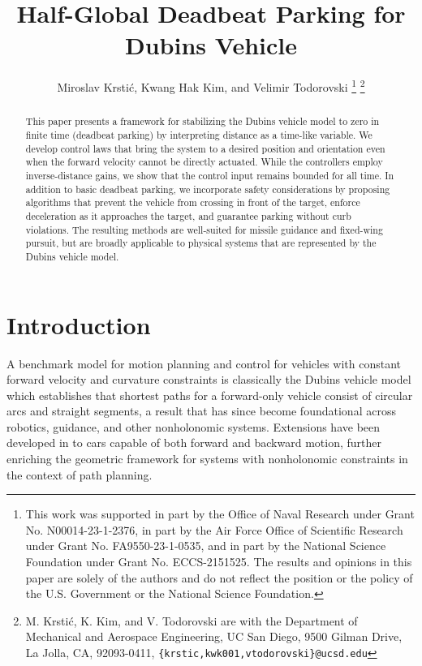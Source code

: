 \documentclass[letterpaper, 10 pt, conference]{ieeeconf}  %
\title{\LARGE \bf
Half-Global Deadbeat Parking for Dubins Vehicle
}
\author{Miroslav Krstić, Kwang Hak Kim, and Velimir Todorovski%
\thanks{This work was supported in part by the Office of Naval Research under Grant No. N00014-23-1-2376, in part by the Air Force Office of Scientific Research under Grant No. FA9550-23-1-0535, and in
part by the National Science Foundation under Grant No. ECCS-2151525. The results and opinions in this paper are solely of the authors and do not reflect the position or the policy of the U.S. Government or the National Science
Foundation.}%
\thanks{M. Krstić, K. Kim, and V. Todorovski are with the Department of Mechanical and Aerospace Engineering, UC San Diego, 9500 Gilman Drive, La Jolla, CA, 92093-0411, {\tt\small \{krstic,kwk001,vtodorovski\}@ucsd.edu}}%
}
\begin{document}
\maketitle
\thispagestyle{empty}
\pagestyle{empty}


\begin{abstract}
This paper presents a framework for stabilizing the Dubins vehicle model to zero in finite time (deadbeat parking) by interpreting distance as a time-like variable. We develop control laws that bring the system to a desired position and orientation even when the forward velocity cannot be directly actuated. While the controllers employ inverse-distance gains, we show that the control input remains bounded for all time. In addition to basic deadbeat parking, we incorporate safety considerations by proposing algorithms that prevent the vehicle from crossing in front of the target, enforce deceleration as it approaches the target, and guarantee parking without curb violations. The resulting methods are well-suited for missile guidance and fixed-wing pursuit, but are broadly applicable to physical systems that are represented by the Dubins vehicle model.
\end{abstract}


\section{Introduction}

A benchmark model for motion planning and control for vehicles with constant forward velocity and curvature constraints is classically the Dubins vehicle model \cite{dubins1957curves} which establishes that shortest paths for a forward-only vehicle consist of circular arcs and straight segments, a result that has since become foundational across robotics, guidance, and other nonholonomic systems. Extensions have been developed in \cite{reeds1990optimal} to cars capable of both forward and backward motion, further enriching the geometric framework for systems with nonholonomic constraints in the context of path planning. 
\end{document}
